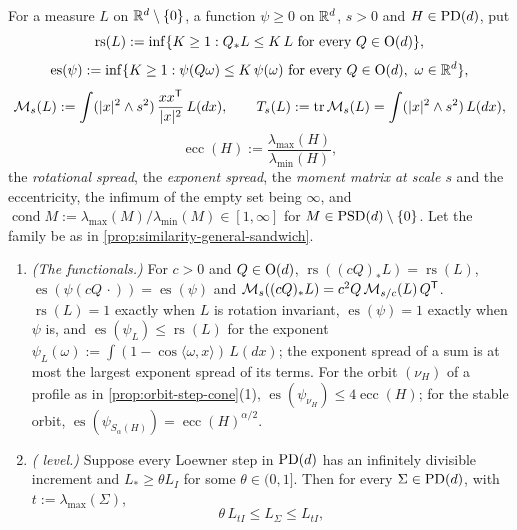 \begin{proposition}
\label{prop:similarity-general-bounded-shape}
\leanok
For a measure $L$ on $\mathbb{R}^d \setminus \{0\}$, a function $\psi \ge 0$ on $\mathbb{R}^d$, $s > 0$ and
$H \in \mathrm{PD}(d)$, put
\[
  \operatorname{rs}(L) := \inf\{K \ge 1 : Q_*L \le K\,L \text{ for every } Q \in \mathrm{O}(d)\},
\]
\[
  \operatorname{es}(\psi) := \inf\{K \ge 1 : \psi(Q\omega) \le K\,\psi(\omega) \text{ for every } Q \in \Orth(d),\ \omega \in \RR^d\},
\]
\[
  \mathcal M_s(L) := \int(|x|^2 \wedge s^2)\,\frac{xx^{\mathsf{T}}}{|x|^2}\,L(dx),
  \qquad T_s(L) := \operatorname{tr}\mathcal M_s(L) = \int(|x|^2 \wedge s^2)\,L(dx),
\]
\[
  \operatorname{ecc}(H) := \frac{\lambda_{\max}(H)}{\lambda_{\min}(H)} ,
\]
the \emph{rotational spread}, the \emph{exponent spread}, the \emph{moment matrix at scale $s$} and
the eccentricity, the infimum of the empty set being $\infty$, and $\operatorname{cond}M := \lambda_{\max}(M)/\lambda_{\min}(M)
\in [1,\infty]$ for $M \in \mathrm{PSD}(d) \setminus \{0\}$. Let the family be as in
\ref{prop:similarity-general-sandwich}.
\begin{enumerate}
\item \emph{(The functionals.)} For $c > 0$ and $Q \in \mathrm{O}(d)$,
$\operatorname{rs}((cQ)_*L) = \operatorname{rs}(L)$, $\operatorname{es}(\psi(cQ\,\cdot)) = \operatorname{es}(\psi)$
and $\mathcal M_s((cQ)_*L) = c^2Q\,\mathcal M_{s/c}(L)\,Q^{\mathsf{T}}$. $\operatorname{rs}(L) = 1$ exactly when $L$ is rotation
invariant, $\operatorname{es}(\psi) = 1$ exactly when $\psi$ is, and $\operatorname{es}(\psi_L) \le \operatorname{rs}(L)$ for the
exponent $\psi_L(\omega) := \int(1 - \cos\langle\omega,x\rangle)\,L(dx)$; the exponent spread of a sum is at
most the largest exponent spread of its terms. For the orbit $(\nu_H)$ of a profile as in
\ref{prop:orbit-step-cone}(1), $\operatorname{es}(\psi_{\nu_H}) \le 4\operatorname{ecc}(H)$; for the stable orbit,
$\operatorname{es}(\psi_{S_\alpha(H)}) = \operatorname{ecc}(H)^{\alpha/2}$.
\item \emph{(\Levy{} level.)} Suppose every Loewner step in $\mathrm{PD}(d)$ has an infinitely divisible
increment and $L_* \ge \theta L_I$ for some $\theta \in (0,1]$. Then for every $\Sigma \in \mathrm{PD}(d)$, with
$t := \lambda_{\max}(\Sigma)$,
\[
  \theta\,L_{tI} \le L_\Sigma \le L_{tI} ,
\]
\end{enumerate}
\end{proposition}
